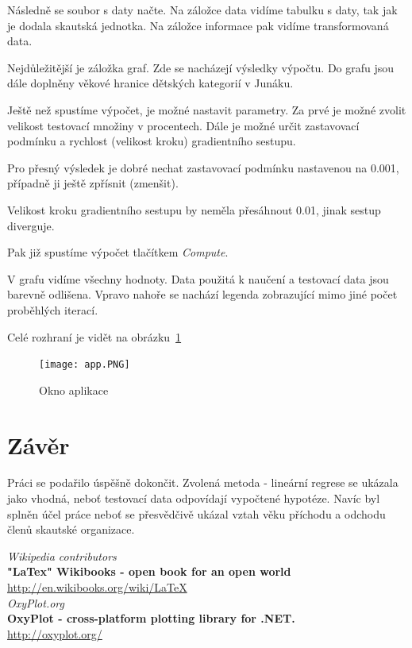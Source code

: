 \documentclass[a4paper,12pt]{article}
\begin{document}
Následně se soubor s daty načte. Na záložce data vidíme tabulku s daty, tak jak je dodala skautská jednotka. Na záložce informace pak vidíme transformovaná data.

Nejdůležitější je záložka graf. Zde se nacházejí výsledky výpočtu. Do grafu jsou dále doplněny věkové hranice dětských kategorií v Junáku.

Ještě než spustíme výpočet, je možné nastavit parametry.  Za prvé je možné zvolit velikost testovací množiny v procentech. Dále je možné určit zastavovací podmínku a rychlost (velikost kroku) gradientního sestupu.

Pro přesný výsledek je dobré nechat zastavovací podmínku nastavenou na 0.001, případně ji ještě zpřísnit (zmenšit).

Velikost kroku gradientního sestupu by neměla přesáhnout 0.01, jinak sestup diverguje.

Pak již spustíme výpočet tlačítkem \emph{Compute}.

V grafu vidíme všechny hodnoty. Data použitá k naučení a testovací data jsou barevně odlišena. Vpravo nahoře se nachází legenda zobrazující mimo jiné počet proběhlých iterací.

Celé rozhraní je vidět na obrázku~\ref{fig:application}

\begin{figure}[h!]
\centering
\texttt{[image: app.PNG]}
\caption{Okno aplikace}
\label{fig:application}
\end{figure}


\section{Závěr}
Práci se podařilo úspěšně dokončit. Zvolená metoda - lineární regrese se ukázala jako vhodná, neboť testovací data odpovídají vypočtené hypotéze. Navíc byl splněn účel práce neboť se přesvědčivě ukázal vztah věku příchodu a odchodu členů skautské organizace.

\begin{thebibliography}{9}

{\em Wikipedia contributors} \\
{\bf "LaTex" Wikibooks - open book for an open world} \\
\url{http://en.wikibooks.org/wiki/LaTeX} \\

{\em OxyPlot.org} \\
{\bf OxyPlot - cross-platform plotting library for .NET.} \\
\url{http://oxyplot.org/} \\

\end{thebibliography}
\end{document}
